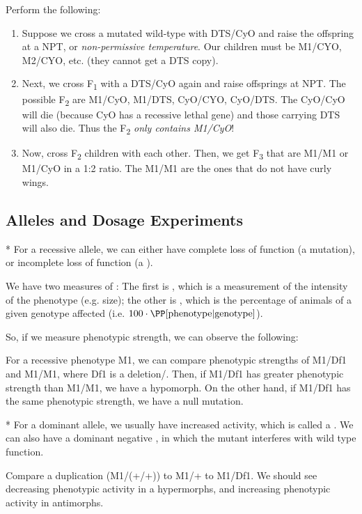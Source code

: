 \begin{exper}
	Perform the following:
	\begin{enumerate}
		\item Suppose we cross a mutated wild-type with DTS/CyO and raise the offspring at a NPT, or \emph{non-permissive temperature}. Our children must be M1/CYO, M2/CYO, etc. (they cannot get a DTS copy).
		\item Next, we cross F\textsubscript1 with a DTS/CyO again and raise offsprings at NPT.
			The possible F\textsubscript2 are M1/CyO, M1/DTS, CyO/CYO, CyO/DTS. The CyO/CyO will die (because CyO has a recessive lethal gene) and those carrying DTS will also die. 
			Thus the F\textsubscript2 \emph{only contains M1/CyO}!
		\item Now, cross F\textsubscript2 children with each other.
			Then, we get F\textsubscript3 that are M1/M1 or M1/CyO in a 1:2 ratio. The M1/M1 are the ones that do not have curly wings.
	\end{enumerate}
\end{exper}

\subsection{Alleles and Dosage Experiments}

\begin{exm}*
	For a recessive allele, we can either have complete loss of function (a  mutation), or incomplete loss of function (a ).
\end{exm}

\begin{defn}
	We have two measures of : The first is , which is a measurement of the intensity of the phenotype (e.g. size); the other is , which is the percentage of animals of a given genotype affected (i.e. $100\cdot \PP[\textnormal{phenotype} | \textnormal{genotype}]$).
\end{defn}

So, if we measure phenotypic strength, we can observe the following:

\begin{exper}
	For a recessive phenotype M1, we can compare phenotypic strengths of M1/Df1 and M1/M1, where Df1 is a deletion/.
	Then, if M1/Df1 has greater phenotypic strength than M1/M1, we have a hypomorph. On the other hand, if M1/Df1 has the same phenotypic strength, we have a null mutation.
\end{exper}

\begin{exm}*
	For a dominant allele, we usually have increased activity, which is called a . We can also have a dominant negative , in which the mutant interferes with wild type function.
\end{exm}

\begin{exper}
	Compare a duplication (M1/(+/+)) to M1/+ to M1/Df1. We should see decreasing phenotypic activity in a hypermorphs, and increasing phenotypic activity in antimorphs.
\end{exper}
